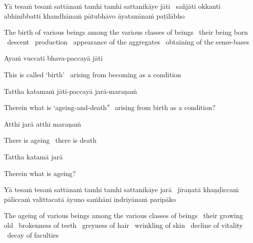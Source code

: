 \begin{pali-hang}
  Yā tesaṁ tesaṁ sattānaṁ tamhi tamhi sattanikāye jāti \breathmark\ sañjāti okkanti abhinibbatti khandhānaṁ pātubhāvo āyatanānaṁ paṭilābho\makeatletter\hyperlink{endnote83-appendix}\makeatother
\end{pali-hang}

\begin{english-hang-verses}
  The birth of various beings among the various classes of beings \breathmark\ their being born \breathmark\ descent \breathmark\ production \breathmark\ appearance of the aggregates \breathmark\ obtaining of the sense-bases
\end{english-hang-verses}

Ayaṁ vuccati bhava-paccayā jāti

\begin{english}
  This is called `birth' \breathmark\ arising from becoming as a condition
\end{english}

Tattha katamaṁ jāti-paccayā jarā-maraṇaṁ

\begin{english}
Therein what is `ageing-and-death'̓ \breathmark\ arising from birth as a condition?
\end{english}

Atthi jarā atthi maraṇaṁ

\begin{english}
There is ageing \breathmark\ there is death
\end{english}

Tattha katamā jarā

\begin{english}
Therein what is ageing?
\end{english}

\begin{pali-hang}
Yā tesaṁ tesaṁ sattānaṁ tamhi tamhi sattanikāye jarā \breathmark\ jīraṇatā khaṇḍiccaṁ pāliccaṁ valittacatā āyuno saṁhāni indriyānaṁ paripāko
\end{pali-hang}

\begin{english-hang-verses}
The ageing of various beings among the various classes of beings \breathmark\ their growing old \breathmark\ brokenness of teeth \breathmark\ greyness of hair \breathmark\ wrinkling of skin \breathmark\ decline of vitality \breathmark\ decay of faculties
\end{english-hang-verses}

